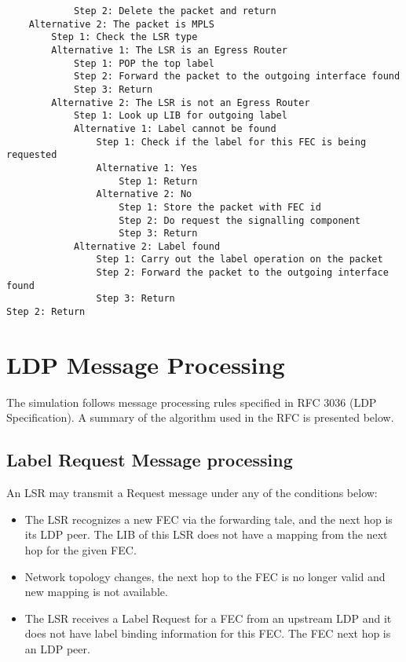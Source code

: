 \begin{verbatim}
            Step 2: Delete the packet and return
    Alternative 2: The packet is MPLS
        Step 1: Check the LSR type
        Alternative 1: The LSR is an Egress Router
            Step 1: POP the top label
            Step 2: Forward the packet to the outgoing interface found
            Step 3: Return
        Alternative 2: The LSR is not an Egress Router
            Step 1: Look up LIB for outgoing label
            Alternative 1: Label cannot be found
                Step 1: Check if the label for this FEC is being requested
                Alternative 1: Yes
                    Step 1: Return
                Alternative 2: No
                    Step 1: Store the packet with FEC id
                    Step 2: Do request the signalling component
                    Step 3: Return
            Alternative 2: Label found
                Step 1: Carry out the label operation on the packet
                Step 2: Forward the packet to the outgoing interface found
                Step 3: Return
Step 2: Return
\end{verbatim}


\section{LDP Message Processing}

The simulation follows message processing rules specified in RFC 3036
(LDP Specification). A summary of the algorithm used in the RFC is
presented below.

\subsection{Label Request Message processing}

An LSR may transmit a Request message under any of the conditions below:

\begin{itemize}
  \item The LSR recognizes a new FEC via the forwarding tale, and the next hop
    is its LDP peer. The LIB of this LSR does not have a mapping from the
    next hop for the given FEC.
  \item Network topology changes, the next hop to the FEC is no longer valid
    and new mapping is not available.
  \item The LSR receives a Label Request for a FEC from an upstream LDP and it
    does not have label binding information for this FEC. The FEC next hop
    is an LDP peer.
\end{itemize}

